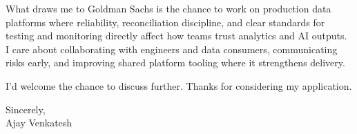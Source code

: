 \documentclass[letterpaper,11pt]{article}
\begin{document}
What draws me to Goldman Sachs is the chance to work on production data platforms where reliability, reconciliation discipline, and clear standards for testing and monitoring directly affect how teams trust analytics and AI outputs. I care about collaborating with engineers and data consumers, communicating risks early, and improving shared platform tooling where it strengthens delivery.

I'd welcome the chance to discuss further. Thanks for considering my application.

\vspace{12pt}
Sincerely, \\
Ajay Venkatesh
\end{document}
